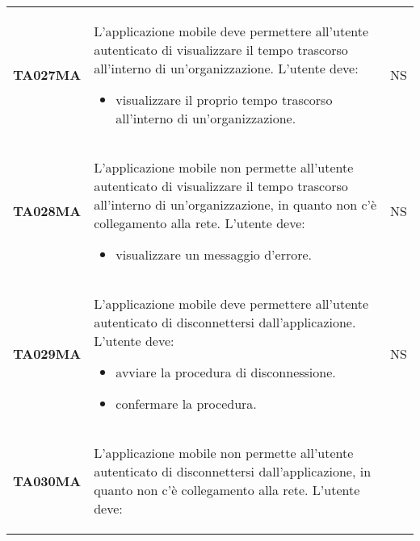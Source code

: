 \documentclass[../piano-di-qualifica.tex]{subfiles}
\begin{document}
\begin{longtable}[H]{>{\centering\bfseries}m{3cm} >{}m{10cm} >{\centering\arraybackslash}m{3cm}}
  TA027MA           & L'applicazione mobile deve permettere all'utente autenticato di visualizzare il tempo trascorso all'interno di un'organizzazione. \newline
  L'utente deve:
  \begin{itemize}
    \item visualizzare il proprio tempo trascorso all'interno di un'organizzazione.
  \end{itemize}
                    & NS                                                                                                                                                                                                                                                               \\
  TA028MA           & L'applicazione mobile non permette all'utente autenticato di visualizzare il tempo trascorso all'interno di un'organizzazione, in quanto non c'è collegamento alla rete. \newline
  L'utente deve:
  \begin{itemize}
    \item visualizzare un messaggio d'errore.
  \end{itemize}
                    & NS                                                                                                                                                                                                                                                               \\
  TA029MA           & L'applicazione mobile deve permettere all'utente autenticato di disconnettersi dall'applicazione. \newline
  L'utente deve:
  \begin{itemize}
    \item avviare la procedura di disconnessione.
    \item confermare la procedura.
  \end{itemize}
                    & NS                                                                                                                                                                                                                                                               \\
  TA030MA           & L'applicazione mobile non permette all'utente autenticato di disconnettersi dall'applicazione, in quanto non c'è collegamento alla rete. \newline
  L'utente deve:
  \begin{itemize}

\end{itemize}
\end{longtable}
\end{document}
